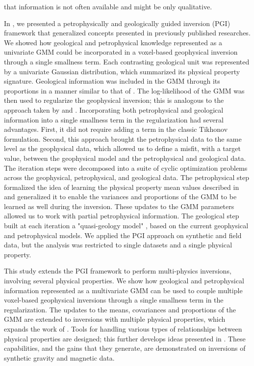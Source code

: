 \documentclass[extra, mreferee]{gji_joint} %
\begin{document}
that information is not often available and might be only qualitative.

In \citet{ggz389}, we presented a petrophysically and geologically guided inversion (PGI) framework that generalized concepts presented in previously published researches. We showed how geological and petrophysical knowledge represented as a univariate GMM could be incorporated in a voxel-based geophysical inversion through a single smallness term. Each contrasting geological unit was represented by a univariate Gaussian distribution, which summarized its physical property signature. Geological information was included in the GMM through its proportions in a manner similar to that of \citet{Giraud2017}. The log-likelihood of the GMM was then used to regularize the geophysical inversion; this is analogous to the approach taken by \citet{Grana2010} and \citet{Grana2017}. Incorporating both petrophysical and geological information into a single smallness term in the regularization had several advantages. First, it did not require adding a term in the classic Tikhonov formulation. Second, this approach brought the petrophysical data to the same level as the geophysical data, which allowed us to define a misfit, with a target value, between the geophysical model and the petrophysical and geological data. The iteration steps were decomposed into a suite of cyclic optimization problems across the geophysical, petrophysical, and geological data. The petrophysical step formalized the idea of learning the physical property mean values described in \citet{Sun2015} and generalized it to enable the variances and proportions of the GMM to be learned as well during the inversion. These updates to the GMM parameters allowed us to work with partial petrophysical information. The geological step built at each iteration a "quasi-geology model" \citep{QuasiGeologicalModel}, based on the current geophysical and petrophysical models. We applied the PGI approach on synthetic and field data, but the analysis was restricted to single datasets and a single physical property.

This study extends the PGI framework to perform multi-physics inversions, involving several physical properties. We show how geological and petrophysical information represented as a multivariate GMM can be used to couple multiple voxel-based geophysical inversions through a single smallness term in the regularization. The updates to the means, covariances and proportions of the GMM are extended to inversions with multiple physical properties, which expands the work of \citet{Sun2016}. Tools for handling various types of relationships between physical properties are designed; this further develops ideas presented in \citet{Sun2017}. These capabilities, and the gains that they generate, are demonstrated on inversions of synthetic gravity and magnetic data.
\end{document}
